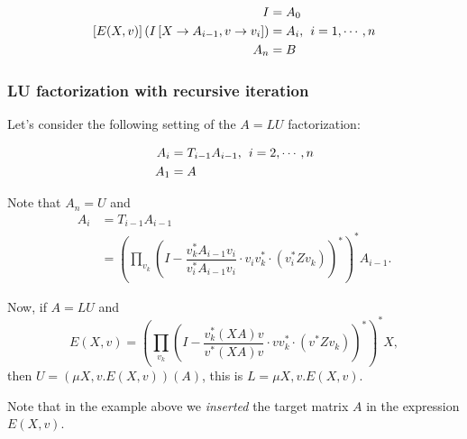 \begin{align*}
I &= A_0 \\
\left[E(X, v)\right](I\left[X\rightarrow A_{i-1}, v\rightarrow v_{i}\right])&=A_i,\hspace{1ex}i=1,\cdots, n \\
A_n &= B
\end{align*}

\subsubsection*{LU factorization with recursive iteration}
Let's consider the following setting of the $A=LU$ factorization:

\begin{align*}
A_i&=T_{i-1}A_{i-1},\hspace{1ex}i=2, \cdots, n \\
A_1&=A \\
\end{align*}

Note that $A_n=U$ and 
\begin{align*}
A_i&=T_{i-1}A_{i-1} \\
&=\left(\prod_{v_k}\left(I-\dfrac{v_k^*A_{i-1}v_i}{v_i^*A_{i-1}v_i}\cdot v_iv_k^*\cdot\left(v_i^*Zv_k\right)\right)^*\right)^*A_{i-1}.
\end{align*}

Now, if $A=LU$ and $$E(X, v)=\left(\prod_{v_k}\left(I-\dfrac{v_k^*(XA)v}{v^*(XA)v}\cdot vv_k^*\cdot\left(v^*Zv_k\right)\right)^*\right)^*X,$$
then $U=(\mu X, v.E(X,v))(A)$, this is $L=\mu X, v.E(X,v)$.

Note that in the example above we \textit{inserted} the target matrix $A$ in the expression $E(X,v)$.

